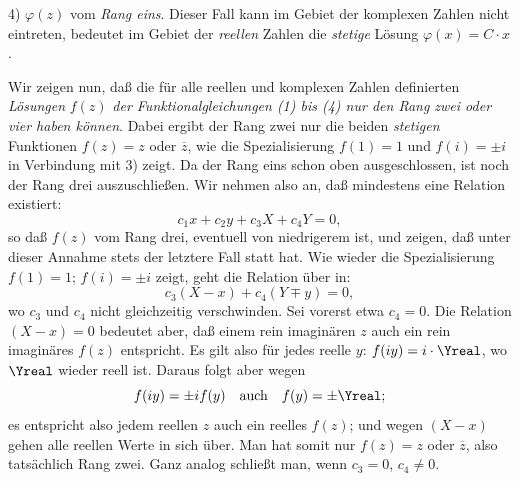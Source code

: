4) \(\varphi(z)\) vom \emph{Rang eins}. Dieser Fall kann im Gebiet der komplexen Zahlen nicht eintreten, bedeutet im Gebiet der \emph{reellen} Zahlen die \emph{stetige} Lösung \(\varphi(x)=C\cdot x\).

Wir zeigen nun, daß die für alle reellen und komplexen Zahlen definierten \emph{Lösungen} \(f(z)\) \emph{der Funktionalgleichungen (1) bis (4) nur den Rang zwei oder vier haben können}. Dabei ergibt der Rang zwei nur die beiden \emph{stetigen} Funktionen \(f(z)=z\) oder \(\overline z\), wie die Spezialisierung \(f(1)=1\) und \(f(i)=\pm i\) in Verbindung mit 3) zeigt. Da der Rang eins schon oben ausgeschlossen, ist noch der Rang drei auszuschließen. Wir nehmen also an, daß mindestens eine Relation existiert:
\[
c_1x+c_2y+c_3X+c_4Y=0,
\]
so daß \(f(z)\) vom Rang drei, eventuell von niedrigerem ist, und zeigen, daß unter dieser Annahme stets der letztere Fall statt hat. Wie wieder die Spezialisierung \(f(1)=1\); \(f(i)=\pm i\) zeigt, geht die Relation über in:
\[
c_3(X-x)+c_4(Y\mp y)=0,
\]
wo \(c_3\) und \(c_4\) nicht gleichzeitig verschwinden. Sei vorerst etwa \(c_4=0\). Die Relation \((X-x)=0\) bedeutet aber, daß einem rein imaginären \(z\) auch ein rein imaginäres \(f(z)\) entspricht. Es gilt also für jedes reelle \(y\): \(f(iy)=i\cdot\Yreal\), wo \(\Yreal\) wieder reell ist. Daraus folgt aber wegen
\[
f(iy)=\pm i f(y)\quad\text{auch}\quad f(y)=\pm\Yreal;
\]
es entspricht also jedem reellen \(z\) auch ein reelles \(f(z)\); und wegen \((X-x)\) gehen alle reellen Werte in sich über. Man hat somit nur \(f(z)=z\) oder \(\overline z\), also tatsächlich Rang zwei. Ganz analog schließt man, wenn \(c_3=0\), \(c_4\ne0\).

